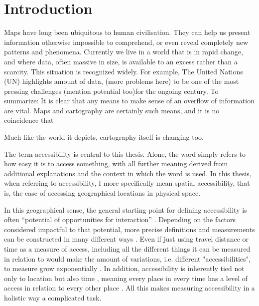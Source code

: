 \section{Introduction}



Maps have long been ubiquitous to human civilisation.
They can help us present information otherwise impossible to comprehend,
or even reveal completely new patterns and phenomena.
Currently we live in a world that is in rapid change, and where data,
often massive in size, is available to an excess rather than a scarcity.
This situation is recognized widely.
For example, The United Nations (UN) highlights amount of data, (more problems here)
to be one of the most pressing challenges (mention potential too)for the ongoing century.  %
To summarize: It is clear that any means to make sense of an overflow of information are vital.
Maps and cartography are certainly such means,
and it is no coincidence that \textcite{kra2021}

Much like the world it depicts, cartography itself is changing too.




The term accessibility is central to this thesis.
Alone, the word simply refers to how easy it is to access something,
with all further meaning derived from
additional explanations and the context in which the word is used.
In this thesis, when referring to accessibility,
I more specifically mean spatial accessibility,
that is, the ease of accessing geographical locations in physical space.

In this geographical sense,
the general starting point for defining accessibility is often
\enquote{potential of opportunities for interaction} \parencite{han1959}.  %
Depending on the factors considered impactful to that potential,
more precise definitions and measurements can be constructed in many different ways
\parencite{pap2016}.
Even if just using travel distance or time as a measure of access,
including all the different things it can be measured in relation to
would make the amount of variations, i.e. different "accessibilities",
to measure grow exponentially \parencite{lev2020}.
In addition, accessibility is inherently tied not only to location
but also time \parencite{jar2018},
meaning every place in every time has a level of access
in relation to every other place \parencite{lev2020}.
All this makes measuring accessibility in a holistic way a complicated task.

